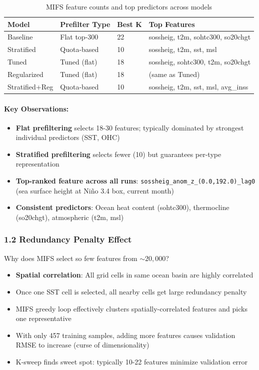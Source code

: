 \documentclass[12pt,a4paper]{article}
\begin{document}
\begin{table}[H]
\centering
\begin{tabular}{llll}
\toprule
\textbf{Model} & \textbf{Prefilter Type} & \textbf{Best K} & \textbf{Top Features} \\
\midrule
Baseline & Flat top-300 & 22 & sossheig, t2m, sohtc300, so20chgt \\
Stratified & Quota-based & 10 & sossheig, t2m, sst, msl \\
Tuned & Tuned (flat) & 18 & sossheig, sohtc300, t2m, so20chgt \\
Regularized & Tuned (flat) & 18 & (same as Tuned) \\
Stratified+Reg & Quota-based & 10 & sossheig, t2m, sst, msl, avg\_inss \\
\bottomrule
\end{tabular}
\caption{MIFS feature counts and top predictors across models}
\end{table}

\paragraph{Key Observations:}
\begin{itemize}
    \item \textbf{Flat prefiltering} selects 18-30 features; typically dominated by strongest individual predictors (SST, OHC)
    \item \textbf{Stratified prefiltering} selects fewer (10) but guarantees per-type representation
    \item \textbf{Top-ranked feature across all runs}: \texttt{sossheig\_anom\_z\_(0.0,192.0)\_lag0} (sea surface height at Niño 3.4 box, current month)
    \item \textbf{Consistent predictors}: Ocean heat content (sohtc300), thermocline (so20chgt), atmospheric (t2m, msl)
\end{itemize}

\subsubsection*{1.2 Redundancy Penalty Effect}

Why does MIFS select so few features from $\sim 20,000$?

\begin{itemize}
    \item \textbf{Spatial correlation}: All grid cells in same ocean basin are highly correlated
    \item Once one SST cell is selected, all nearby cells get large redundancy penalty
    \item MIFS greedy loop effectively clusters spatially-correlated features and picks one representative
    \item With only 457 training samples, adding more features causes validation RMSE to increase (curse of dimensionality)
    \item K-sweep finds sweet spot: typically 10-22 features minimize validation error
\end{itemize}
\end{document}
